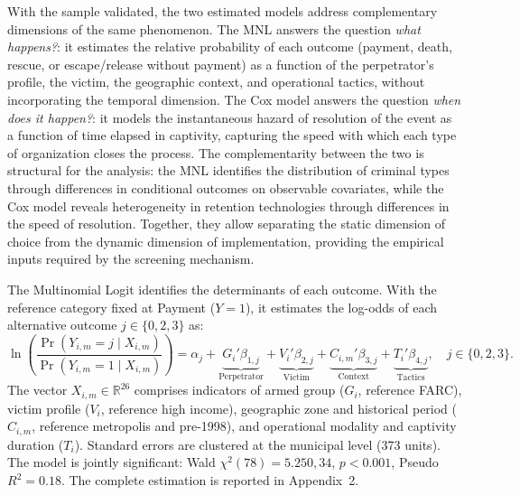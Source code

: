 \documentclass[ecta,nameyear,draft]{econsocart}
\theoremstyle{plain}
\theoremstyle{definition}
\newcommand{\1}{\mathbf{1}}
\begin{document}
With the sample validated, the two estimated models address complementary dimensions of the same phenomenon. The MNL answers the question \textit{what happens?}: it estimates the relative probability of each outcome (payment, death, rescue, or escape/release without payment) as a function of the perpetrator's profile, the victim, the geographic context, and operational tactics, without incorporating the temporal dimension. The Cox model answers the question \textit{when does it happen?}: it models the instantaneous hazard of resolution of the event as a function of time elapsed in captivity, capturing the speed with which each type of organization closes the process. The complementarity between the two is structural for the analysis: the MNL identifies the distribution of criminal types through differences in conditional outcomes on observable covariates, while the Cox model reveals heterogeneity in retention technologies through differences in the speed of resolution. Together, they allow separating the static dimension of choice from the dynamic dimension of implementation, providing the empirical inputs required by the screening mechanism.



The Multinomial Logit identifies the determinants of each outcome. With the reference category fixed at Payment ($Y=1$), it estimates the log-odds of each alternative outcome $j\in\{0,2,3\}$ as:
\enlargethispage{3\baselineskip}
{\small\setlength{\abovedisplayskip}{2pt}%
\setlength{\belowdisplayskip}{2pt}%
\setlength{\abovedisplayshortskip}{2pt}%
\setlength{\belowdisplayshortskip}{2pt}%
\begin{equation}
\ln\!\left(\frac{\Pr(Y_{i,m}=j \mid X_{i,m})}{\Pr(Y_{i,m}=1 \mid X_{i,m})}\right)
= \alpha_j
+ \underbrace{G_i'\beta_{1,j}}_{\text{Perpetrator}}
+ \underbrace{V_i'\beta_{2,j}}_{\text{Victim}}
+ \underbrace{C_{i,m}'\beta_{3,j}}_{\text{Context}}
+ \underbrace{T_i'\beta_{4,j}}_{\text{Tactics}},
\quad j\in\{0,2,3\}.
\label{eq:mnl}
\end{equation}
}
The vector $X_{i,m}\in\mathbb{R}^{26}$ comprises indicators of armed group ($G_i$, reference FARC), victim profile ($V_i$, reference high income), geographic zone and historical period ($C_{i,m}$, reference metropolis and pre-1998), and operational modality and captivity duration ($T_i$). Standard errors are clustered at the municipal level (373 units). The model is jointly significant: Wald $\chi^2(78)=5.250{,}34$, $p<0.001$, Pseudo $R^2=0.18$. The complete estimation is reported in Appendix~2.
\end{document}
